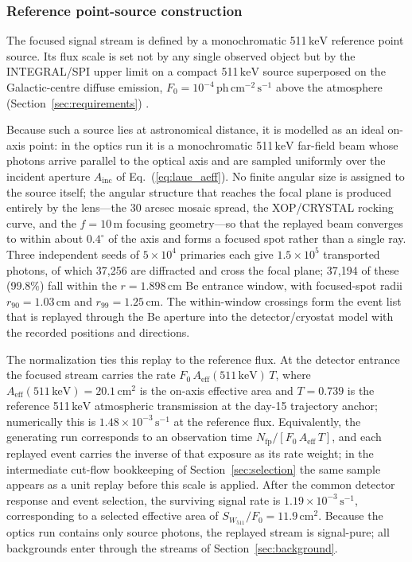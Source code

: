\documentclass[11pt]{article}
\newcommand{\keV}{\ensuremath{\,\mathrm{keV}}}
\newcommand{\phcms}{\ensuremath{\,\mathrm{ph\,cm^{-2}\,s^{-1}}}}
\newcommand{\cps}{\ensuremath{\,\mathrm{s^{-1}}}}
\newcommand{\wii}{W_{511}}
\newcommand{\aeff}{A_{\mathrm{eff}}}
\newcommand{\fzero}{F_{0}}
\begin{document}
\subsubsection{Reference point-source construction}
\label{subsec:pointsource}

The focused signal stream is defined by a monochromatic 511\keV{} reference
point source. Its flux scale is set not by any single observed object but by the
INTEGRAL/SPI upper limit on a compact 511\keV{} source superposed on the
Galactic-centre diffuse emission, $\fzero=10^{-4}\phcms$ above the atmosphere
(Section~\ref{sec:requirements}) \cite{Siegert2016AA,DeCesare2011}.

Because such a source lies at astronomical distance, it is modelled as an ideal
on-axis point: in the optics run it is a monochromatic 511\keV{} far-field beam
whose photons arrive parallel to the optical axis and are sampled uniformly over
the incident aperture $A_{\mathrm{inc}}$ of Eq.~(\ref{eq:laue_aeff}). No finite
angular size is assigned to the source itself; the angular structure that reaches
the focal plane is produced entirely by the lens---the 30 arcsec mosaic spread,
the XOP/CRYSTAL rocking curve, and the $f=10\,\mathrm{m}$ focusing geometry---so
that the replayed beam converges to within about $0.4^\circ$ of the axis and
forms a focused spot rather than a single ray. Three independent seeds of
$5\times10^{4}$ primaries each give $1.5\times10^{5}$ transported photons, of
which 37,256 are diffracted and cross the focal plane; 37,194 of these (99.8\%)
fall within the $r=1.898\,\mathrm{cm}$ Be entrance window, with focused-spot
radii $r_{90}=1.03\,\mathrm{cm}$ and $r_{99}=1.25\,\mathrm{cm}$. The
within-window crossings form the event list that is replayed through the Be
aperture into the detector/cryostat model with the recorded positions and
directions.

The normalization ties this replay to the reference flux. At the detector
entrance the focused stream carries the rate $\fzero\,\aeff(511\keV)\,T$, where
$\aeff(511\keV)=20.1\,\mathrm{cm^2}$ is the on-axis effective area and $T=0.739$
is the reference 511\keV{} atmospheric transmission at the day-15 trajectory
anchor; numerically this is $1.48\times10^{-3}\cps$ at the reference flux.
Equivalently, the generating run corresponds to an observation time
$N_{\mathrm{fp}}/[\fzero\,\aeff\,T]$, and each replayed event carries the inverse
of that exposure as its rate weight; in the intermediate cut-flow bookkeeping of
Section~\ref{sec:selection} the same sample appears as a unit replay before this
scale is applied. After the common detector response and event selection, the
surviving signal rate is $1.19\times10^{-3}\cps$, corresponding to a selected
effective area of $S_{\wii}/\fzero=11.9\,\mathrm{cm^2}$. Because the optics run
contains only source photons, the replayed stream is signal-pure; all
backgrounds enter through the streams of Section~\ref{sec:background}.
\end{document}
